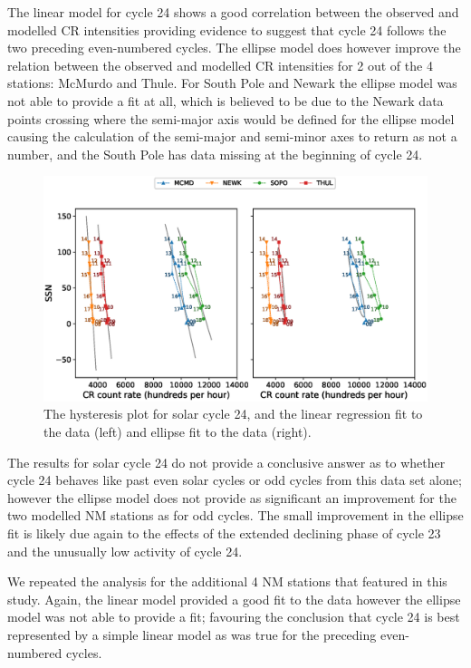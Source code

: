 The linear model for cycle 24 shows a good correlation between the observed and modelled CR intensities providing evidence to suggest that cycle 24 follows the two preceding even-numbered cycles. The ellipse model does however improve the relation between the observed and modelled CR intensities for 2 out of the 4 stations: McMurdo and Thule. For South Pole and Newark the ellipse model was not able to provide a fit at all, which is believed to be due to the Newark data points crossing where the semi-major axis would be defined for the ellipse model causing the calculation of the semi-major and semi-minor axes to return as not a number, and the South Pole has data missing at the beginning of cycle 24.

\begin{figure}
	\includegraphics[width=\columnwidth]{24.eps}
	\caption{The hysteresis plot for solar cycle 24, and the linear regression fit to the data (left) and ellipse fit to the data (right).}
	\label{fig:24}
\end{figure}

The results for solar cycle 24 do not provide a conclusive answer as to whether cycle 24 behaves like past even solar cycles or odd cycles from this data set alone; however the ellipse model does not provide as significant an improvement for the two modelled NM stations as for odd cycles. The small improvement in the ellipse fit is likely due again to the effects of the extended declining phase of cycle 23 and the unusually low activity of cycle 24.

We repeated the analysis for the additional 4 NM stations that featured in this study. Again, the linear model provided a good fit to the data however the ellipse model was not able to provide a fit; favouring the conclusion that cycle 24 is best represented by a simple linear model as was true for the preceding even-numbered cycles.


